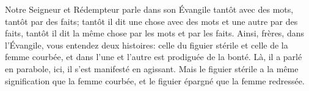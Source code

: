 Notre Seigneur et Rédempteur parle dans son Évangile
		tantôt avec des mots, tantôt par des faits;
	tantôt il dit une chose avec des mots et une autre par des faits,
	tantôt il dit la même chose par les mots et par les faits.
Ainsi, frères, dans l'Évangile, vous entendez deux histoires:
		celle du figuier stérile et celle de la femme courbée,
	et dans l'une et l'autre est prodiguée de la bonté.
Là, il a parlé en parabole, ici, il s'est manifesté en agissant.
Mais le figuier stérile a la même signification que la femme courbée,
	et le figuier épargné que la femme redressée.

